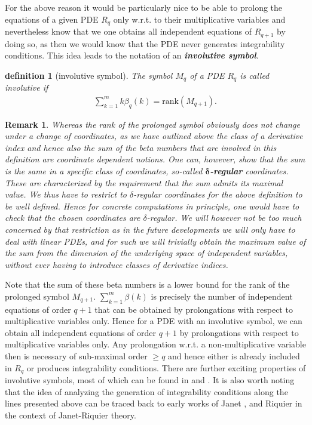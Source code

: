 \documentclass[a4paper,12pt, DIV=14, BCOR=5mm, twoside, headsepline, numbers=noenddot]{scrbook}
\newtheorem{definition}{definition}[section]
\newtheorem*{remark}{Remark}
\begin{document}
For the above reason it would be particularly nice to be able to prolong the equations of a given PDE $R_q$ only w.r.t. to their multiplicative variables and nevertheless know that we one obtains all independent equations of $R_{q+1}$ by doing so, as then we would know that the PDE never generates integrability conditions. This idea leads to the notation of an \textit{\textbf{involutive symbol}}. 
\begin{definition}[involutive symbol]
The symbol $M_q$ of a PDE $R_q$ is called involutive if 
\begin{align}\label{sumBeta}
    \sum_{k=1}^m k\beta_q(k) = \mathrm{rank}(M_{q+1}).
\end{align}
\end{definition}
\begin{remark}
Whereas the rank of the prolonged symbol obviously does not change under a change of coordinates,
as we have outlined above the class of a derivative index and hence also the sum of the beta numbers that are involved in this definition are coordinate dependent notions. One can, however, show that the sum is the same in a specific class of coordinates, so-called \textit{\textbf{$\boldsymbol{\delta}$-regular}} coordinates. These are characterized by the requirement that the sum admits its maximal value.
We thus have to restrict to $\delta$-regular coordinates for the above definition to be well defined.
Hence for concrete computations in principle, one would have to check that the chosen coordinates are $\delta$-regular.  We will however not be too much concerned by that restriction as in the future developments we will only have to deal with linear PDEs, and for such we will trivially obtain the maximum value of the sum from the dimension of the underlying space of independent variables, without ever having to introduce classes of derivative indices.
\end{remark}
Note that the sum of these beta numbers is a lower bound for the rank of the prolonged symbol $M_{q+1}$. $\sum_{k=1}^m \beta(k)$ is precisely the number of independent equations of order $q+1$ that can be obtained by prolongations with respect to multiplicative variables only.  
Hence for a PDE with an involutive symbol, we can obtain all independent equations of order $q+1$ by prolongations with respect to multiplicative variables only. Any prolongation w.r.t. a non-multiplicative variable then is necessary of sub-maximal order $\geq q$ and hence either is already included in $R_q$ or produces integrability conditions. There are further exciting properties of involutive symbols, most of which can be found in \cite{seiler2009involution} and \cite{seiler2009involution}. It is also worth noting that the idea of analyzing the generation of integrability conditions along the lines presented above can be traced back to early works of Janet \cite{janet1920systemes}, \cite{MSM_1927__21__1_0} and Riquier \cite{bateman_1910} in the context of Janet-Riquier theory.
\end{document}

